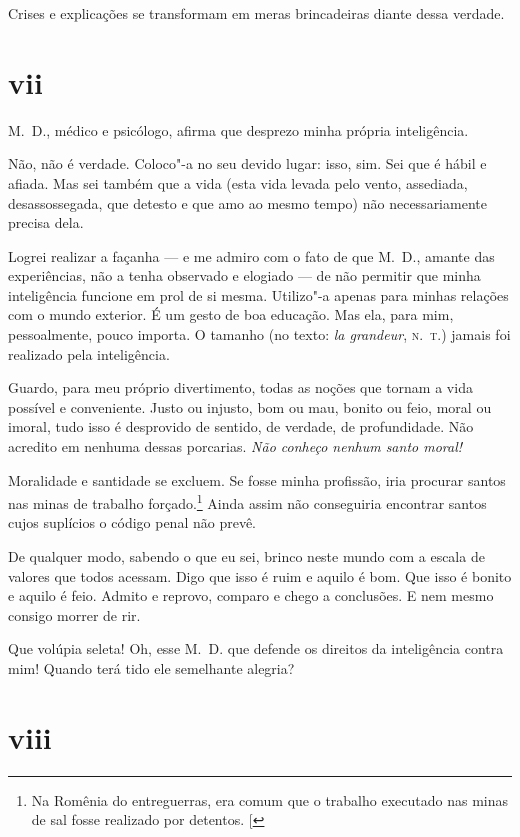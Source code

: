 Crises e explicações se transformam em meras brincadeiras diante dessa
verdade.

\section{vii}


M.~D., médico e psicólogo, afirma que desprezo minha própria
inteligência.

Não, não é verdade. Coloco"-a no seu devido lugar: isso, sim. Sei que é
hábil e afiada. Mas sei também que a vida (esta vida levada pelo vento,
assediada, desassossegada, que detesto e que amo ao mesmo
tempo) não necessariamente precisa dela.

Logrei realizar a façanha --- e me admiro com o fato de que M.~D., amante
das experiências, não a tenha observado e elogiado --- de não permitir que
minha inteligência funcione em prol de si mesma. Utilizo"-a apenas para
minhas relações com o mundo exterior. É um gesto de boa educação. Mas
ela, para mim, pessoalmente, pouco importa. O tamanho (no texto: \emph{la
grandeur}, \textsc{n.~t.}) jamais foi realizado pela inteligência.

Guardo, para meu próprio divertimento, todas as noções que tornam a vida
possível e conveniente. Justo ou injusto, bom ou mau, bonito ou feio,
moral ou imoral, tudo isso é desprovido de sentido, de verdade, de
profundidade. Não acredito em nenhuma dessas porcarias. \emph{Não
conheço nenhum santo moral!}

Moralidade e santidade se excluem. Se fosse minha profissão,
iria procurar santos nas minas de trabalho
forçado.\footnote{Na Romênia do entreguerras, era comum que o trabalho executado nas minas de sal fosse realizado por detentos. {[}\versal{N.~T.}{]}} Ainda
assim não conseguiria encontrar santos cujos suplícios o código
penal não prevê.

De qualquer modo, sabendo o que eu sei, brinco neste mundo com a escala
de valores que todos acessam. Digo que isso é ruim e aquilo é bom. Que
isso é bonito e aquilo é feio. Admito e reprovo, comparo e chego a
conclusões. E nem mesmo consigo morrer de rir.

Que volúpia seleta! Oh, esse M.~D. que defende os direitos da
inteligência contra mim! Quando terá tido ele semelhante alegria?

\section{viii}

